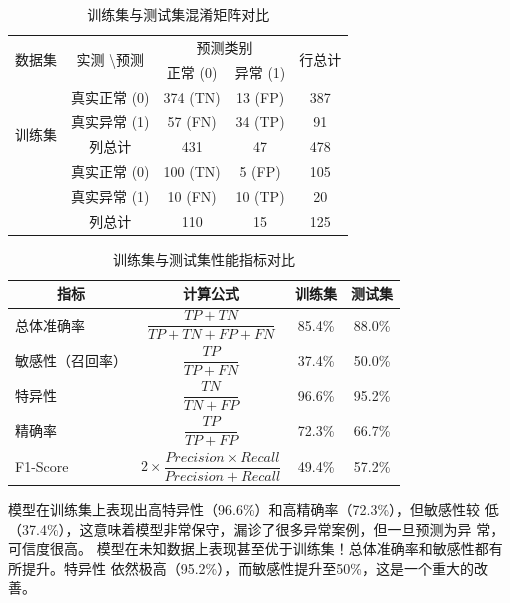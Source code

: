 \documentclass[withoutpreface,notoc]{cumcmthesis}
\begin{document}
	\begin{table}[H]
	\centering
	\caption{训练集与测试集混淆矩阵对比}
	\label{tab:combined_confusion_matrix}
		\begin{tabular}{|c|c|c|c|c|}
		\hline
		\multirow{2}{*}{数据集} & \multirow{2}{*}{实测 \textbackslash 预测} & \multicolumn{2}{c|}{预测类别} & \multirow{2}{*}{行总计} \\ \cline{3-4}
		& & 正常 (0) & 异常 (1) & \\ \hline
		\multirow{4}{*}{训练集} & 真实正常 (0) & 374 (TN) & 13 (FP) & 387 \\ \cline{2-5}
		& 真实异常 (1) & 57 (FN) & 34 (TP) & 91 \\ \cline{2-5}
		& 列总计 & 431 & 47 & 478 \\ \hline
		\multirow{4}{*}{测试集} & 真实正常 (0) & 100 (TN) & 5 (FP) & 105 \\ \cline{2-5}
		& 真实异常 (1) & 10 (FN) & 10 (TP) & 20 \\ \cline{2-5}
		& 列总计 & 110 & 15 & 125 \\ \hline
		\end{tabular}
	\end{table}


	\begin{table}[H]
	\centering
	\caption{训练集与测试集性能指标对比}
	\label{tab:combined_performance_metrics}
	\renewcommand{\arraystretch}{2.2} %
		\begin{tabular}{|l|c|c|c|}
		\hline
		\multicolumn{1}{|c|}{\textbf{指标}} & \multicolumn{1}{c|}{\textbf{计算公式}} & \multicolumn{1}{c|}{\textbf{训练集}} & \multicolumn{1}{c|}{\textbf{测试集}} \\ 
		\hline
		总体准确率 & $\dfrac{TP + TN}{TP + TN + FP + FN}$ & 85.4\% & 88.0\% \\ 
		\hline
		敏感性（召回率） & $\dfrac{TP}{TP + FN}$ & 37.4\% & 50.0\% \\ 
		\hline
		特异性 & $\dfrac{TN}{TN + FP}$ & 96.6\% & 95.2\% \\ 
		\hline
		精确率 & $\dfrac{TP}{TP + FP}$ & 72.3\% & 66.7\% \\ 
		\hline
		F1-Score & $2 \times \dfrac{Precision \times Recall}{Precision + Recall}$ & 49.4\% & 57.2\% \\ 
		\hline
		\end{tabular}
	\end{table}

	模型在训练集上表现出高特异性（96.6\%）和高精确率（72.3\%），但敏感性较
	低（37.4\%），这意味着模型非常保守，漏诊了很多异常案例，但一旦预测为异
	常，可信度很高。
	模型在未知数据上表现甚至优于训练集！总体准确率和敏感性都有所提升。特异性
	依然极高（95.2\%），而敏感性提升至50\%，这是一个重大的改善。
\end{document}
